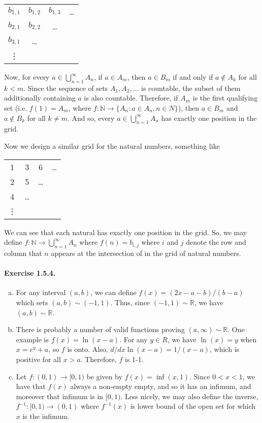 \documentclass{article}
\newcommand{\inv}{^{-1}}
\newcommand{\N}{\mathbb{N}}
\newcommand{\R}{\mathbb{R}}
\begin{document}
\begin{enumerate}[(a)]
    \begin{center}
    \begin{tabular}{cccc}
        $b_{1,1}$ & $b_{1,2}$ & $b_{1,3}$ & \ldots \\
        $b_{2,1}$ & $b_{2,2}$ & \ldots \\ 
        $b_{3,1}$ & \ldots \\
        \vdots
    \end{tabular}
    \end{center}
    
    Now, for every $a \in \bigcup_{n=1}^\infty A_n$, if $a \in A_m$, then $a \in B_m$ if and only if $a\notin A_k$ for all $k<m$. Since the sequence of sets $A_1,A_2,\ldots$ is countable, the subset of them additionally containing $a$ is also countable. Therefore, if $A_m$ is the first qualifying set (i.e. $f(1) = A_m$, where $f:\N \to \{A_n : a\in A_n, n\in N\}$), then $a\in B_m$ and $a\notin B_k$ for all $k \neq m$. And so, every $a \in \bigcup_{n=1}^\infty A_n$ has exactly one position in the grid.
    
    Now we design a similar grid for the natural numbers, something like
    
    \begin{center}
    \begin{tabular}{cccc}
        1 & 3 & 6 & \ldots \\
        2 & 5 & \ldots \\ 
        4 & \ldots \\
        \vdots
    \end{tabular}
    \end{center}

    We can see that each natural has exactly one position in the grid. So, we may define $f: \N \to \bigcup_{n=1}^\infty A_n$ where $f(n) = b_{i,j}$ where $i$ and $j$ denote the row and column that $n$ appears at     the intersection of in the grid of natural numbers. 
\end{enumerate}

\paragraph{Exercise 1.5.4.}
\begin{enumerate}[(a)]
    \item For any interval $(a,b)$, we can define $f(x) = (2x - a - b)/(b-a)$ which sets $(a,b) \sim (-1,1)$. Thus, since $(-1,1)\sim \R$, we have $(a,b) \sim \R$.
    \item There is probably a number of valid functions proving $(a,\infty) \sim \R$. One example is $f(x) = \ln(x-a)$. For any $y\in R$, we have $\ln(x) = y$ when $x = e^y +a$, so $f$ is onto. Also, $d/dx \ln(x-a) = 1/(x-a)$, which is positive for all $x > a$. Therefore, $f$ is 1-1.
    \item Let $f:(0,1) \to [0,1)$ be given by $f(x) = \inf(x,1)$. Since $0<x<1$, we have that $f(x)$ always a non-empty empty, and so it has an infimum, and moreover that infimum is in $[0,1)$. Less nicely, we may also define the inverse, $f\inv : [0,1) \to (0,1)$ where $f\inv(x)$ is lower bound of the open set for which $x$ is the infimum.
\end{enumerate}
\end{document}
